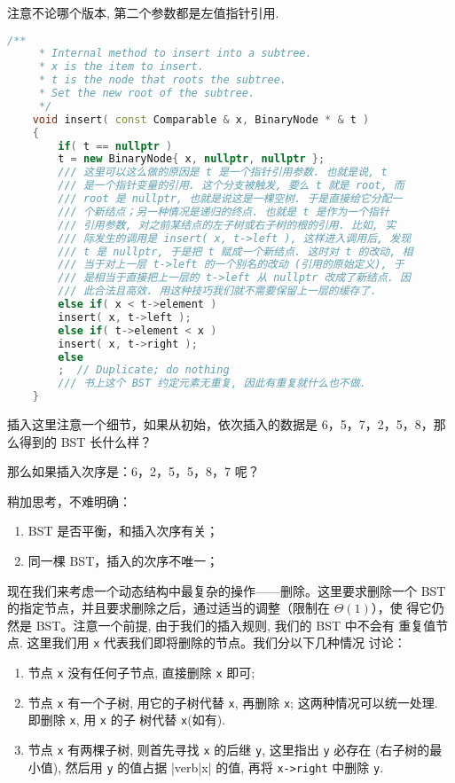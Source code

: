 \documentclass[a4paper]{ctexart}
\theoremstyle{definition}
\theoremstyle{definition}
\begin{document}
注意不论哪个版本, 第二个参数都是左值指针引用. 
\begin{lstlisting}[language=C++]
      /**
     * Internal method to insert into a subtree.
     * x is the item to insert.
     * t is the node that roots the subtree.
     * Set the new root of the subtree.
     */
    void insert( const Comparable & x, BinaryNode * & t )
	{
	    if( t == nullptr )
		t = new BinaryNode{ x, nullptr, nullptr };
	    /// 这里可以这么做的原因是 t 是一个指针引用参数. 也就是说, t
	    /// 是一个指针变量的引用. 这个分支被触发, 要么 t 就是 root, 而
	    /// root 是 nullptr, 也就是说这是一棵空树. 于是直接给它分配一
	    /// 个新结点；另一种情况是递归的终点. 也就是 t 是作为一个指针
	    /// 引用参数, 对之前某结点的左子树或右子树的根的引用. 比如, 实
	    /// 际发生的调用是 insert( x, t->left ), 这样进入调用后, 发现
	    /// t 是 nullptr, 于是把 t 赋成一个新结点. 这时对 t 的改动, 相
	    /// 当于对上一层 t->left 的一个别名的改动 (引用的原始定义), 于
	    /// 是相当于直接把上一层的 t->left 从 nullptr 改成了新结点. 因
	    /// 此合法且高效. 用这种技巧我们就不需要保留上一层的缓存了. 
	    else if( x < t->element )
		insert( x, t->left );
	    else if( t->element < x )
		insert( x, t->right );
	    else
		;  // Duplicate; do nothing
	    /// 书上这个 BST 约定元素无重复, 因此有重复就什么也不做. 
	}
\end{lstlisting}

插入这里注意一个细节，如果从初始，依次插入的数据是 6，5，7，2，5，8，那么得到的 BST 长什么样？


那么如果插入次序是：6，2，5，5，8，7 呢？


稍加思考，不难明确：

\begin{enumerate}
\item BST 是否平衡，和插入次序有关；
\item 同一棵 BST，插入的次序不唯一；
\end{enumerate}

现在我们来考虑一个动态结构中最复杂的操作——删除。这里要求删除一个 BST
的指定节点，并且要求删除之后，通过适当的调整（限制在 $\Theta(1)$），使
得它仍然是 BST。注意一个前提, 由于我们的插入规则, 我们的 BST 中不会有
重复值节点. 这里我们用 \verb|x| 代表我们即将删除的节点。我们分以下几种情况
讨论：

\begin{enumerate}
\item 节点 \verb|x| 没有任何子节点, 直接删除 \verb|x| 即可; 
\item 节点 \verb|x| 有一个子树, 用它的子树代替 \verb|x|, 再删除
  \verb|x|; 这两种情况可以统一处理. 即删除 \verb|x|, 用 \verb|x| 的子
  树代替 \verb|x|(如有).
\item 节点 \verb|x| 有两棵子树, 则首先寻找 \verb|x| 的后继 \verb|y|,
  这里指出 \verb|y| 必存在 (右子树的最小值), 然后用 \verb|y| 的值占据
  |verb|x| 的值, 再将 \verb|x->right| 中删除 \verb|y|.
\end{enumerate}
\end{document}

